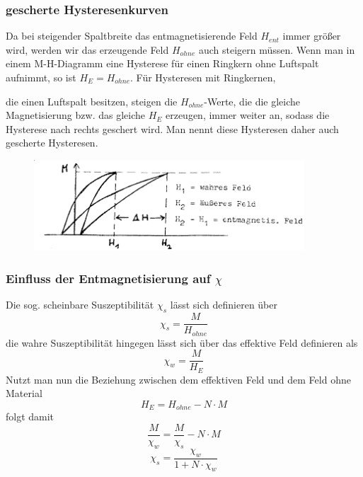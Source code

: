         \subsubsection*{gescherte Hysteresenkurven}
            Da bei steigender Spaltbreite das entmagnetisierende Feld $H_{ent}$ immer größer wird, werden wir das erzeugende Feld $H_{ohne}$
            auch steigern müssen. Wenn man in einem M-H-Diagramm eine Hysterese für einen Ringkern
            ohne Luftspalt aufnimmt, so ist $H_{E}=H_{ohne}$. Für Hysteresen mit Ringkernen,

            die einen Luftspalt besitzen, steigen die $H_{ohne}$-Werte, die die gleiche Magnetisierung
            bzw. das gleiche $H_{E}$ erzeugen, immer weiter an, sodass die Hysterese nach rechts
            geschert wird. Man nennt diese Hysteresen daher auch gescherte Hysteresen.
            \begin{figure}
                \centering
                \includegraphics[width=0.9\textwidth]{Images/geschert.png}
            \end{figure}

        \subsubsection*{Einfluss der Entmagnetisierung auf $\chi$}
            Die sog. scheinbare Suszeptibilität $\chi_s$ lässt sich definieren über
            \begin{equation}
                \chi_s = \frac{M}{H_{ohne}}
            \end{equation}
            die wahre Suszeptibilität hingegen lässt sich über das effektive Feld definieren als
            \begin{equation}
                \chi_w = \frac{M}{H_{E}}
            \end{equation}
            Nutzt man nun die Beziehung zwischen dem effektiven Feld und dem Feld ohne Material
            \begin{equation}
                H_E = H_{ohne} - N\cdot M
            \end{equation}
            folgt damit
            \begin{equation}
                \frac{M}{\chi_w} = \frac{M}{\chi_s} - N \cdot M
            \end{equation}
            \begin{equation}
                \chi_s = \frac{\chi_w}{1+N\cdot \chi_w}
            \end{equation}
